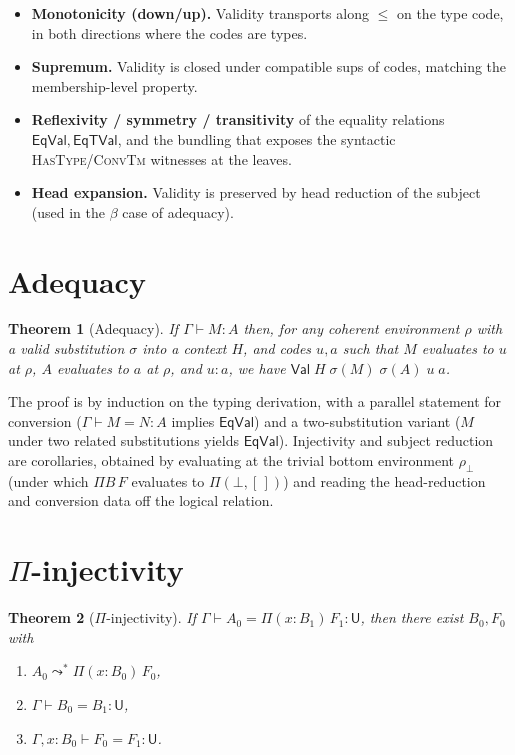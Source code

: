 \documentclass[11pt]{article}
\newcommand{\hastype}[3]{#1 \vdash #2 : #3}
\newcommand{\conveq}[4]{#1 \vdash #2 = #3 : #4}
\newcommand{\Pitype}[2]{\Pi(#1)\,#2}
\newcommand{\U}{\mathsf{U}}
\newcommand{\Red}{\mathrel{\leadsto^{*}}}
\newcommand{\Bot}{\bot}
\newcommand{\PiC}[2]{\Pi(#1,#2)}        %
\newcommand{\Val}{\mathsf{Val}}
\newcommand{\EqVal}{\mathsf{EqVal}}
\newcommand{\EqTVal}{\mathsf{EqTVal}}
\theoremstyle{plain}
\newtheorem{theorem}{Theorem}
\theoremstyle{definition}
\begin{document}
\begin{itemize}
  \item \textbf{Monotonicity (down/up).} Validity transports along $\leq$ on the
    type code, in both directions where the codes are types.
  \item \textbf{Supremum.} Validity is closed under compatible sups of codes,
    matching the membership-level property.
  \item \textbf{Reflexivity / symmetry / transitivity} of the equality
    relations $\EqVal,\EqTVal$, and the bundling that exposes the syntactic
    \textsc{HasType}/\textsc{ConvTm} witnesses at the leaves.
  \item \textbf{Head expansion.} Validity is preserved by head reduction of the
    subject (used in the $\beta$ case of adequacy).
\end{itemize}

\section{Adequacy}

\begin{theorem}[Adequacy]\label{thm:adequacy}
  If $\hastype{\Gamma}{M}{A}$ then, for any coherent environment $\rho$ with a
  valid substitution $\sigma$ into a context $H$, and codes $u,a$ such that $M$
  evaluates to $u$ at $\rho$, $A$ evaluates to $a$ at $\rho$, and $u : a$, we
  have $\Val\;H\;\sigma(M)\;\sigma(A)\;u\;a$.
\end{theorem}
The proof is by induction on the typing derivation, with a parallel statement
for conversion ($\conveq{\Gamma}{M}{N}{A}$ implies $\EqVal$) and a
two-substitution variant ($M$ under two related substitutions yields $\EqVal$).
Injectivity and subject reduction are corollaries, obtained by evaluating at
the trivial bottom environment $\rho_\bot$ (under which $\Pi B\,F$ evaluates to
$\PiC{\Bot}{[\,]}$) and reading the head-reduction and conversion data off the
logical relation.

\section{$\Pi$-injectivity}

\begin{theorem}[$\Pi$-injectivity]\label{thm:pi-inj}
  If $\conveq{\Gamma}{A_0}{\Pitype{x{:}B_1}{F_1}}{\U}$, then there exist
  $B_0, F_0$ with
  \begin{enumerate}
    \item $A_0 \Red \Pitype{x{:}B_0}{F_0}$,
    \item $\conveq{\Gamma}{B_0}{B_1}{\U}$,
    \item $\conveq{\Gamma, x{:}B_0}{F_0}{F_1}{\U}$.
  \end{enumerate}
\end{theorem}
\end{document}
